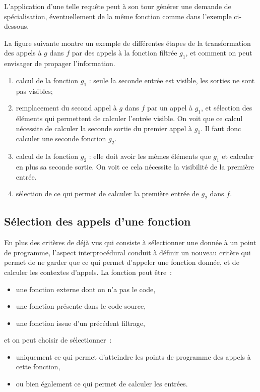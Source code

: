   L'application d'une telle requête peut à son tour générer une demande de
  spécialisation, éventuellement de la même fonction comme dans l'exemple
  ci-dessous.

\begin{exemple}
La figure suivante montre un exemple de différentes étapes de la
transformation des appels à $g$ dans $f$ par des appels à la fonction filtrée
$g_1$, et comment on peut envisager de propager l'information.

\begin{center}
\end{center}

\begin{enumerate}
  \item calcul de la fonction $g_1$ : seule la seconde entrée est visible, les
    sorties ne sont pas visibles;
  \item remplacement du second appel à $g$ dans $f$ par un appel à $g_1$,
    et sélection des éléments qui permettent de calculer l'entrée visible.
    On voit que ce calcul nécessite de calculer la seconde sortie du premier
    appel à $g_1$. Il faut donc calculer une seconde fonction $g_2$.
  \item calcul de la fonction $g_2$ : elle doit avoir les mêmes éléments que
    $g_1$ et calculer en plus sa seconde sortie. On voit ce cela nécessite la
    visibilité de la première entrée.
  \item sélection de ce qui permet de calculer la première entrée de $g_2$ dans
    $f$.
\end{enumerate}
\end{exemple}

\subsection{Sélection des appels d'une fonction}

  En plus des critères de \slicing déjà vus qui consiste à sélectionner une
  donnée à un point de programme, l'aspect interprocédural conduit à
  définir un nouveau critère qui permet 
  de ne garder que ce qui permet d'appeler une fonction donnée, 
  et de calculer les contextes d'appels. 
  La fonction peut être~:
  \begin{itemize}
    \item une fonction externe dont on n'a pas le code,
    \item une fonction présente dans le code source,
    \item une fonction issue d'un précédent filtrage,
  \end{itemize}
  et on peut choisir de sélectionner~:
  \begin{itemize}
    \item uniquement ce qui permet d'atteindre les points de programme des
      appels à cette fonction,
    \item ou bien également ce qui permet de calculer les entrées.
  \end{itemize}


